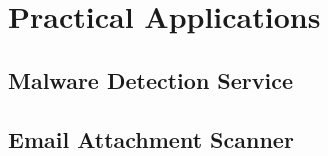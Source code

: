 
\chapter{Practical Applications}
\label{chapter:practical_applications}

\section{Malware Detection Service}
\label{section:malware_service}

\section{Email Attachment Scanner}
\label{section:email_scanner}
